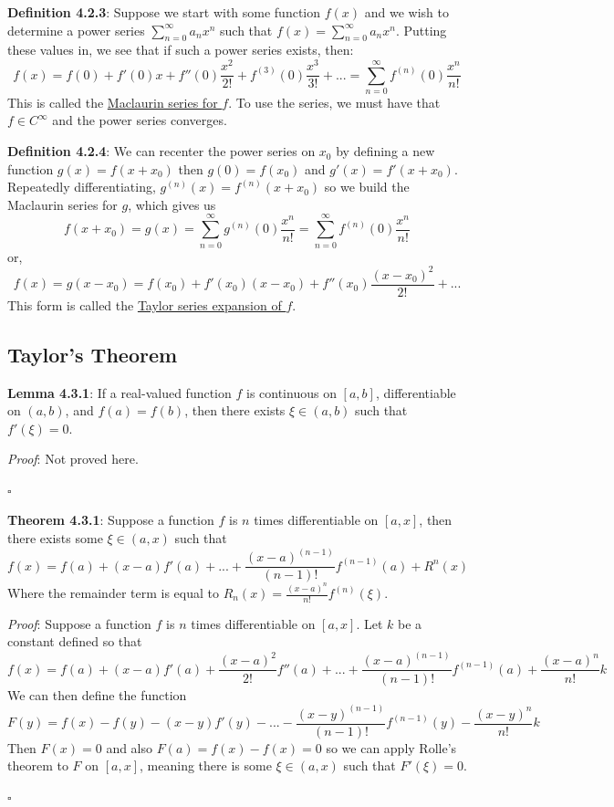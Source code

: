 \documentclass{article}
\newcommand{\separate}[1] {\vspace{#1 pt}\noindent}
\newcommand{\definition}[2]{\textbf{Definition #1}: #2\label{def:#1}}
\newcommand{\proof}[2]{\textit{Proof}: #2 \begin{flushright}\(\square\)\end{flushright}\label{prf:#1}}
\newcommand{\theorem}[3]{\textbf{Theorem #1}: #2 \par\separate{3}\proof{thm:#1}{#3}\label{thm:#1}}
\newcommand{\lemma}[3]{\textbf{Lemma #1}: #2 \par\separate{3}\proof{lem:#1}{#3}\label{lem:#1}}
\begin{document}
\separate{7}\definition{4.2.3}{Suppose we start with some function \(f(x)\) and we wish to determine a power series \(\sum_{n=0}^{\infty}a_nx^n\) such that \(f(x)=\sum_{n=0}^{\infty}a_nx^n\). Putting these values in, we see that if such a power series exists, then:
\begin{equation}
    f(x) = f(0) + f'(0)x + f''(0)\frac{x^2}{2!} + f^{(3)}(0)\frac{x^3}{3!} + ... = \sum_{n=0}^{\infty} f^{(n)}(0)\frac{x^n}{n!}
\end{equation}
This is called the \underline{Maclaurin series for \(f\)}. To use the series, we must have that \(f \in C^\infty\) and the power series converges.}

\separate{7}\definition{4.2.4}{We can recenter the power series on \(x_0\) by defining a new function \(g(x) = f(x + x_0)\) then \(g(0) = f(x_0)\) and \(g'(x) = f'(x+x_0)\). Repeatedly differentiating, \(g^{(n)}(x) = f^{(n)}(x+x_0)\) so we build the Maclaurin series for \(g\), which gives us
\begin{equation}
    f(x+x_0) = g(x) = \sum_{n=0}^{\infty}g^{(n)}(0)\frac{x^n}{n!} = \sum_{n=0}^{\infty}f^{(n)}(0)\frac{x^n}{n!}
\end{equation}
or, 
\begin{equation}
    f(x) = g(x-x_0) = f(x_0) + f'(x_0)(x-x_0) + f''(x_0)\frac{(x-x_0)^2}{2!} + ...
\end{equation}
This form is called the \underline{Taylor series expansion of \(f\)}.}

\newpage\subsection{Taylor's Theorem}

\lemma{4.3.1}{If a real-valued function \(f\) is continuous on \([a,b]\), differentiable on \((a,b)\), and \(f(a) = f(b)\), then there exists \(\xi \in (a,b)\) such that \(f'(\xi) = 0\).}{Not proved here.}

\separate{7}\theorem{4.3.1}{Suppose a function \(f\) is \(n\) times differentiable on \([a,x]\), then there exists some \(\xi \in (a,x)\) such that
\begin{equation}
    f(x) = f(a) + (x-a)f'(a) + ... + \frac{(x-a)^{(n-1)}}{(n-1)!}f^{(n-1)}(a) + R^n(x)
\end{equation}
Where the remainder term is equal to \(R_n(x) = \frac{(x-a)^n}{n!}f^{(n)}(\xi)\).
}{Suppose a function \(f\) is \(n\) times differentiable on \([a,x]\). Let \(k\) be a constant defined so that 
\begin{equation}
    f(x) = f(a) + (x-a)f'(a) + \frac{(x-a)^2}{2!}f''(a) + ... + \frac{(x-a)^{(n-1)}}{(n-1)!}f^{(n-1)}(a) + \frac{(x-a)^n}{n!}k
\end{equation}
We can then define the function 
\begin{equation}
    F(y) = f(x) - f(y) - (x-y)f'(y) - ... - \frac{(x-y)^{(n-1)}}{(n-1)!}f^{(n-1)}(y) - \frac{(x-y)^n}{n!}k
\end{equation}
Then \(F(x) = 0\) and also \(F(a) = f(x) - f(x) = 0\) so we can apply Rolle's theorem to \(F\) on \([a,x]\), meaning there is some \(\xi \in (a,x)\) such that \(F'(\xi) = 0\).}
\end{document}
